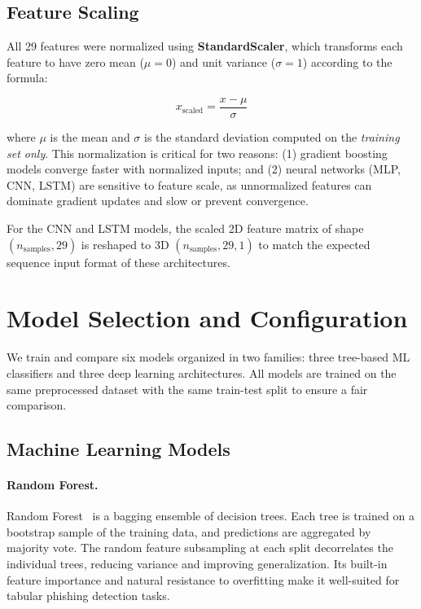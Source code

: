 \subsection{Feature Scaling}

All 29 features were normalized using \textbf{StandardScaler}, which transforms each feature to have zero mean ($\mu = 0$) and unit variance ($\sigma = 1$) according to the formula:

\begin{equation}
    x_{\text{scaled}} = \frac{x - \mu}{\sigma}
\end{equation}

where $\mu$ is the mean and $\sigma$ is the standard deviation computed on the \textit{training set only}. This normalization is critical for two reasons: (1) gradient boosting models converge faster with normalized inputs; and (2) neural networks (MLP, CNN, LSTM) are sensitive to feature scale, as unnormalized features can dominate gradient updates and slow or prevent convergence.

For the CNN and LSTM models, the scaled 2D feature matrix of shape $(n_{\text{samples}}, 29)$ is reshaped to 3D $(n_{\text{samples}}, 29, 1)$ to match the expected sequence input format of these architectures.

\section{Model Selection and Configuration}

We train and compare six models organized in two families: three tree-based ML classifiers and three deep learning architectures. All models are trained on the same preprocessed dataset with the same train-test split to ensure a fair comparison.

\subsection{Machine Learning Models}

\paragraph{Random Forest.}
Random Forest~\cite{breiman2001} is a bagging ensemble of decision trees. Each tree is trained on a bootstrap sample of the training data, and predictions are aggregated by majority vote. The random feature subsampling at each split decorrelates the individual trees, reducing variance and improving generalization. Its built-in feature importance and natural resistance to overfitting make it well-suited for tabular phishing detection tasks.

